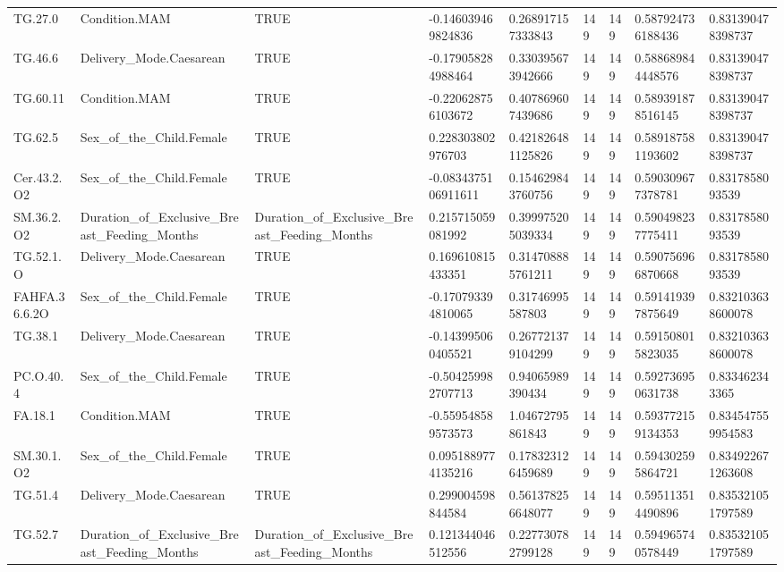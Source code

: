 \begin{longtable}{lllllllll}
TG.27.0 & Condition.MAM & TRUE & -0.146039469824836 & 0.268917157333843 & 149 & 149 & 0.587924736188436 & 0.831390478398737 \\
TG.46.6 & Delivery\_Mode.Caesarean & TRUE & -0.179058284988464 & 0.330395673942666 & 149 & 149 & 0.588689844448576 & 0.831390478398737 \\
TG.60.11 & Condition.MAM & TRUE & -0.220628756103672 & 0.407869607439686 & 149 & 149 & 0.589391878516145 & 0.831390478398737 \\
TG.62.5 & Sex\_of\_the\_Child.Female & TRUE & 0.228303802976703 & 0.421826481125826 & 149 & 149 & 0.589187581193602 & 0.831390478398737 \\
Cer.43.2.O2 & Sex\_of\_the\_Child.Female & TRUE & -0.0834375106911611 & 0.154629843760756 & 149 & 149 & 0.590309677378781 & 0.8317858093539 \\
SM.36.2.O2 & Duration\_of\_Exclusive\_Breast\_Feeding\_Months & Duration\_of\_Exclusive\_Breast\_Feeding\_Months & 0.215715059081992 & 0.399975205039334 & 149 & 149 & 0.590498237775411 & 0.8317858093539 \\
TG.52.1.O & Delivery\_Mode.Caesarean & TRUE & 0.169610815433351 & 0.314708885761211 & 149 & 149 & 0.590756966870668 & 0.8317858093539 \\
FAHFA.36.6.2O & Sex\_of\_the\_Child.Female & TRUE & -0.170793394810065 & 0.31746995587803 & 149 & 149 & 0.591419397875649 & 0.832103638600078 \\
TG.38.1 & Delivery\_Mode.Caesarean & TRUE & -0.143995060405521 & 0.267721379104299 & 149 & 149 & 0.591508015823035 & 0.832103638600078 \\
PC.O.40.4 & Sex\_of\_the\_Child.Female & TRUE & -0.504259982707713 & 0.94065989390434 & 149 & 149 & 0.592736950631738 & 0.833462343365 \\
FA.18.1 & Condition.MAM & TRUE & -0.559548589573573 & 1.04672795861843 & 149 & 149 & 0.593772159134353 & 0.834547559954583 \\
SM.30.1.O2 & Sex\_of\_the\_Child.Female & TRUE & 0.0951889774135216 & 0.178323126459689 & 149 & 149 & 0.594302595864721 & 0.834922671263608 \\
TG.51.4 & Delivery\_Mode.Caesarean & TRUE & 0.299004598844584 & 0.561378256648077 & 149 & 149 & 0.595113514490896 & 0.835321051797589 \\
TG.52.7 & Duration\_of\_Exclusive\_Breast\_Feeding\_Months & Duration\_of\_Exclusive\_Breast\_Feeding\_Months & 0.121344046512556 & 0.227730782799128 & 149 & 149 & 0.594965740578449 & 0.835321051797589 \\

\end{longtable}
